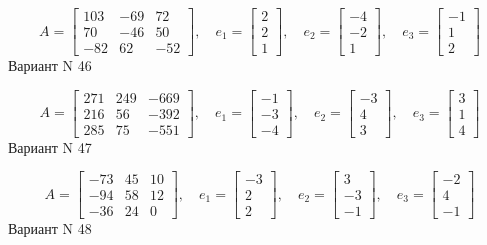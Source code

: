 \documentclass[11pt]{report}
\begin{document}
$$A = \left[\begin{matrix}103 & -69 & 72\\70 & -46 & 50\\-82 & 62 & -52\end{matrix}\right],\quad e_1 = \left[\begin{matrix}2\\2\\1\end{matrix}\right],\quad e_2 = \left[\begin{matrix}-4\\-2\\1\end{matrix}\right],\quad e_3 = \left[\begin{matrix}-1\\1\\2\end{matrix}\right]$$Вариант N 46

$$A = \left[\begin{matrix}271 & 249 & -669\\216 & 56 & -392\\285 & 75 & -551\end{matrix}\right],\quad e_1 = \left[\begin{matrix}-1\\-3\\-4\end{matrix}\right],\quad e_2 = \left[\begin{matrix}-3\\4\\3\end{matrix}\right],\quad e_3 = \left[\begin{matrix}3\\1\\4\end{matrix}\right]$$Вариант N 47

$$A = \left[\begin{matrix}-73 & 45 & 10\\-94 & 58 & 12\\-36 & 24 & 0\end{matrix}\right],\quad e_1 = \left[\begin{matrix}-3\\2\\2\end{matrix}\right],\quad e_2 = \left[\begin{matrix}3\\-3\\-1\end{matrix}\right],\quad e_3 = \left[\begin{matrix}-2\\4\\-1\end{matrix}\right]$$Вариант N 48
\end{document}
